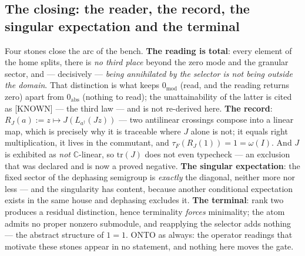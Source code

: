 \documentclass[11pt]{article}
\theoremstyle{definition}\newtheorem{deriv}{Derivation}
\begin{document}
\subsection*{The closing: the reader, the record, the singular expectation and the terminal}Four stones close the arc of the bench. \textbf{The reading is total}: every element of the home splits, there is \emph{no third place} beyond the zero mode and the granular sector, and --- decisively --- \emph{being annihilated by the selector is not being outside the domain}. That distinction is what keeps $0_{\mathrm{mod}}$ (read, and the reading returns zero) apart from $0_{\mathrm{abs}}$ (nothing to read); the unattainability of the latter is cited as \textsf{[KNOWN]} --- the third law --- and is not re-derived here. \textbf{The record}: $R_J(a) := z \mapsto J(L_{a^\dagger}(J z))$ --- two antilinear crossings compose into a linear map, which is precisely why it is traceable where $J$ alone is not; it equals right multiplication, it lives in the commutant, and $\tau_F(R_J(1)) = 1 = \omega(I)$. And $J$ is exhibited as \emph{not} $\mathbb{C}$-linear, so $\mathrm{tr}(J)$ does not even typecheck --- an exclusion that was declared and is now a proved negative. \textbf{The singular expectation}: the fixed sector of the dephasing semigroup is \emph{exactly} the diagonal, neither more nor less --- and the singularity has content, because another conditional expectation exists in the same house and dephasing excludes it. \textbf{The terminal}: rank two produces a residual distinction, hence terminality \emph{forces} minimality; the atom admits no proper nonzero submodule, and reapplying the selector adds nothing --- the abstract structure of $1=1$. \textsf{ONTO} as always: the operator readings that motivate these stones appear in no statement, and nothing here moves the gate.
\end{document}
